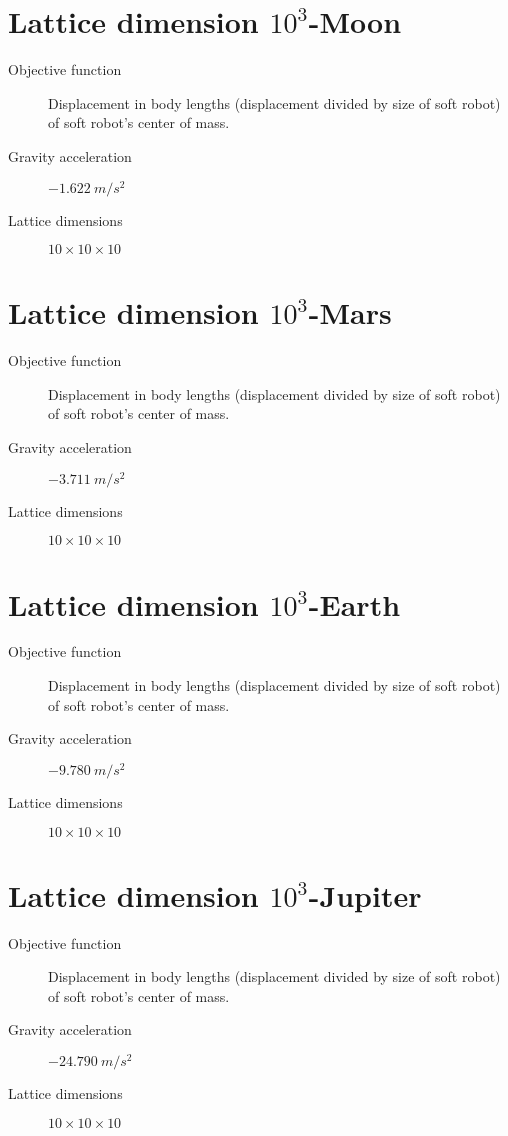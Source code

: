 \section{Lattice dimension $10^3$-Moon}
\label{Settings-size10-moon}
\begin{small}
\begin{description}
\item[Objective function]{Displacement in body lengths (displacement divided by size of soft robot) of soft robot's center of mass.}
\item[Gravity acceleration]{$-1.622\ m/s^2$}
\item[Lattice dimensions]{$10 \times 10 \times 10$}
\end{description}
\end{small}

\section{Lattice dimension $10^3$-Mars}
\label{Settings-size10-mars}
\begin{small}
\begin{description}
\item[Objective function]{Displacement in body lengths (displacement divided by size of soft robot) of soft robot's center of mass.}
\item[Gravity acceleration]{$-3.711\ m/s^2$}
\item[Lattice dimensions]{$10 \times 10 \times 10$}
\end{description}
\end{small}

\section{Lattice dimension $10^3$-Earth}
\label{Settings-size10-earth}
\begin{small}
\begin{description}
\item[Objective function]{Displacement in body lengths (displacement divided by size of soft robot) of soft robot's center of mass.}
\item[Gravity acceleration]{$-9.780\ m/s^2$}
\item[Lattice dimensions]{$10 \times 10 \times 10$}
\end{description}
\end{small}

\section{Lattice dimension $10^3$-Jupiter}
\label{Settings-size10-jupiter}
\begin{small}
\begin{description}
\item[Objective function]{Displacement in body lengths (displacement divided by size of soft robot) of soft robot's center of mass.}
\item[Gravity acceleration]{$-24.790\ m/s^2$}
\item[Lattice dimensions]{$10 \times 10 \times 10$}
\end{description}
\end{small}


